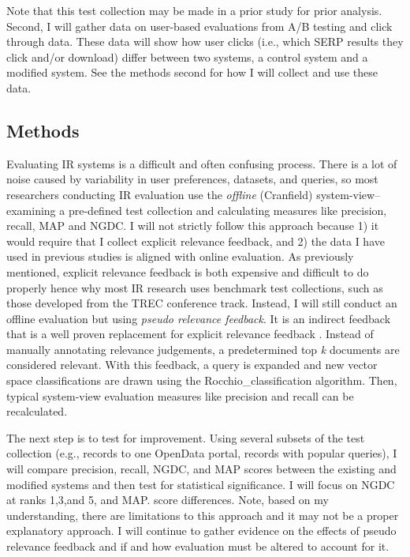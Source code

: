 Note that this test collection may be made in a prior study for prior analysis. Second, I will gather data on user-based evaluations from A/B testing and click through data. These data will show how user clicks (i.e., which SERP results they click and/or download) differ between two systems, a control system and a modified system. See the methods second for how I will collect and use these data.

\subsection{Methods}
Evaluating IR systems is a difficult and often confusing process. There is a lot of noise caused by variability in user preferences, datasets, and queries, so most researchers conducting IR evaluation use the \emph{offline} (Cranfield) system-view–examining a pre-defined test collection and calculating measures like precision, recall, MAP and NGDC. I will not strictly follow this approach because 1) it would require that I collect explicit relevance feedback, and 2) the data I have used in previous studies is  aligned with online evaluation. As previously mentioned, explicit relevance feedback is both expensive and difficult to do properly hence why most IR research uses benchmark test collections, such as those developed from the TREC conference track. Instead, I will still conduct an offline evaluation but using \textit{pseudo relevance feedback}. It is an indirect feedback that is a well proven replacement for explicit relevance feedback \cite{Manning2008}. Instead of manually annotating relevance judgements, a predetermined top \emph{k} documents are considered relevant. With this feedback, a query is expanded and new vector space classifications are drawn using the \gls{Rocchio_classification} algorithm. Then, typical system-view evaluation measures like precision and recall can be recalculated.

The next step is to test for improvement. Using several subsets of the test collection (e.g., records to one OpenData portal, records with popular queries), I will compare precision, recall, NGDC, and MAP scores between the existing and modified systems and then test for statistical significance. I will focus on NGDC at ranks 1,3,and 5, and MAP. score differences. Note, based on my understanding, there are limitations to this approach and it may not be a proper explanatory approach. I will continue to gather evidence on the effects of pseudo relevance feedback and if and how evaluation must be altered to account for it.


